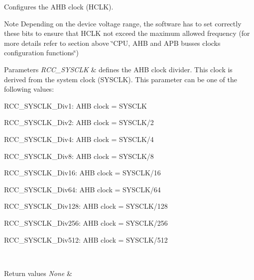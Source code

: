 Configures the A\+HB clock (H\+C\+LK). 

\begin{DoxyNote}{Note}
Depending on the device voltage range, the software has to set correctly these bits to ensure that H\+C\+LK not exceed the maximum allowed frequency (for more details refer to section above \char`\"{}\+C\+P\+U, A\+H\+B and A\+P\+B busses clocks configuration functions\char`\"{}) 
\end{DoxyNote}

\begin{DoxyParams}{Parameters}
{\em R\+C\+C\+\_\+\+S\+Y\+S\+C\+LK} & defines the A\+HB clock divider. This clock is derived from the system clock (S\+Y\+S\+C\+LK). This parameter can be one of the following values\+: \begin{DoxyItemize}
\item R\+C\+C\+\_\+\+S\+Y\+S\+C\+L\+K\+\_\+\+Div1\+: A\+HB clock = S\+Y\+S\+C\+LK \item R\+C\+C\+\_\+\+S\+Y\+S\+C\+L\+K\+\_\+\+Div2\+: A\+HB clock = S\+Y\+S\+C\+L\+K/2 \item R\+C\+C\+\_\+\+S\+Y\+S\+C\+L\+K\+\_\+\+Div4\+: A\+HB clock = S\+Y\+S\+C\+L\+K/4 \item R\+C\+C\+\_\+\+S\+Y\+S\+C\+L\+K\+\_\+\+Div8\+: A\+HB clock = S\+Y\+S\+C\+L\+K/8 \item R\+C\+C\+\_\+\+S\+Y\+S\+C\+L\+K\+\_\+\+Div16\+: A\+HB clock = S\+Y\+S\+C\+L\+K/16 \item R\+C\+C\+\_\+\+S\+Y\+S\+C\+L\+K\+\_\+\+Div64\+: A\+HB clock = S\+Y\+S\+C\+L\+K/64 \item R\+C\+C\+\_\+\+S\+Y\+S\+C\+L\+K\+\_\+\+Div128\+: A\+HB clock = S\+Y\+S\+C\+L\+K/128 \item R\+C\+C\+\_\+\+S\+Y\+S\+C\+L\+K\+\_\+\+Div256\+: A\+HB clock = S\+Y\+S\+C\+L\+K/256 \item R\+C\+C\+\_\+\+S\+Y\+S\+C\+L\+K\+\_\+\+Div512\+: A\+HB clock = S\+Y\+S\+C\+L\+K/512 \end{DoxyItemize}
\\
\hline
\end{DoxyParams}

\begin{DoxyRetVals}{Return values}
{\em None} & \\
\hline
\end{DoxyRetVals}
\mbox{\label{group___r_c_c_ga523b06e73f6aa8a03e42299c855066a8}} 

